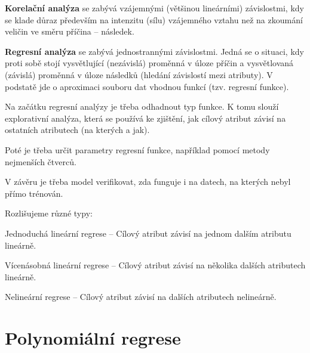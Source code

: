 \begin{compactitem}
    \item \textbf{Korelační analýza} se zabývá vzájemnými (většinou lineárními) závislostmi, kdy se klade důraz především na intenzitu (sílu) vzájemného vztahu než na zkoumání veličin ve směru příčina -- následek.

    \item \textbf{Regresní analýza} se zabývá jednostrannými závislostmi. Jedná se o situaci, kdy proti sobě stojí vysvětlující (nezávislá) proměnná v úloze příčin a vysvětlovaná (závislá) proměnná v úloze následků (hledání závislostí mezi atributy). V podstatě jde o aproximaci souboru dat vhodnou funkcí (tzv. regresní funkce). \begin{compactitem}
        \item Na začátku regresní analýzy je třeba odhadnout typ funkce. K tomu slouží explorativní analýza, která se používá ke zjištění, jak cílový atribut závisí na ostatních atributech (na kterých a jak).
        \item Poté je třeba určit parametry regresní funkce, například pomocí metody nejmenších čtverců.
        \item V závěru je třeba model verifikovat, zda funguje i na datech, na kterých nebyl přímo trénován.
    \end{compactitem}

    \item Rozlišujeme různé typy: \begin{compactitem}
        \item Jednoduchá lineární regrese -- Cílový atribut závisí na jednom dalším atributu lineárně.
        \item Vícenásobná lineární regrese -- Cílový atribut závisí na několika dalších atributech lineárně.
        \item Nelineární regrese -- Cílový atribut závisí na dalších atributech nelineárně.
    \end{compactitem}

\end{compactitem}


\section{Polynomiální regrese}

